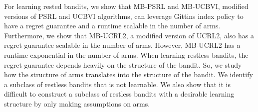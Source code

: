 For learning rested bandits, we show that MB-PSRL and MB-UCBVI, modified versions of PSRL and UCBVI algorithms, can leverage Gittins index policy to have a regret guarantee and a runtime scalable in the number of arms. Furthermore, we show that MB-UCRL2, a modified version of UCRL2, also has a regret guarantee scalable in the number of arms. However, MB-UCRL2 has a runtime exponential in the number of arms.
When learning restless bandits, the regret guarantee depends heavily on the structure of the bandit.
So, we study how the structure of arms translates into the structure of the bandit.
We identify a subclass of restless bandits that is not learnable.
We also show that it is difficult to construct a subclass of restless bandits with a desirable learning structure by only making assumptions on arms.

